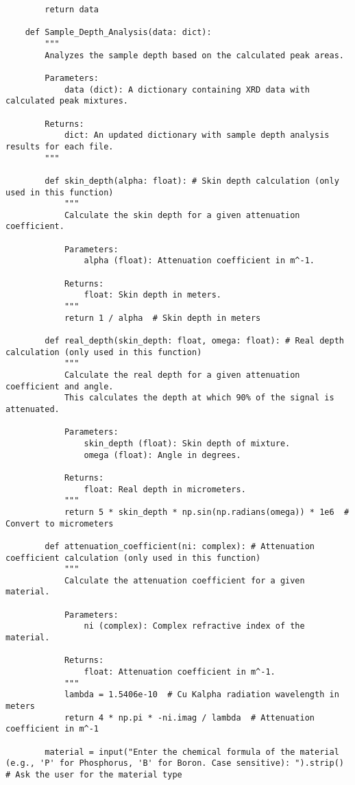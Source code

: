 \begin{lstlisting}
        return data

    def Sample_Depth_Analysis(data: dict):
        """
        Analyzes the sample depth based on the calculated peak areas.

        Parameters:
            data (dict): A dictionary containing XRD data with calculated peak mixtures.

        Returns:
            dict: An updated dictionary with sample depth analysis results for each file.
        """

        def skin_depth(alpha: float): # Skin depth calculation (only used in this function)
            """
            Calculate the skin depth for a given attenuation coefficient.

            Parameters:
                alpha (float): Attenuation coefficient in m^-1.

            Returns:
                float: Skin depth in meters.
            """
            return 1 / alpha  # Skin depth in meters

        def real_depth(skin_depth: float, omega: float): # Real depth calculation (only used in this function)
            """
            Calculate the real depth for a given attenuation coefficient and angle.
            This calculates the depth at which 90% of the signal is attenuated.

            Parameters:
                skin_depth (float): Skin depth of mixture.
                omega (float): Angle in degrees.

            Returns:
                float: Real depth in micrometers.
            """
            return 5 * skin_depth * np.sin(np.radians(omega)) * 1e6  # Convert to micrometers

        def attenuation_coefficient(ni: complex): # Attenuation coefficient calculation (only used in this function)
            """
            Calculate the attenuation coefficient for a given material.

            Parameters:
                ni (complex): Complex refractive index of the material.

            Returns:
                float: Attenuation coefficient in m^-1.
            """
            lambda = 1.5406e-10  # Cu Kalpha radiation wavelength in meters
            return 4 * np.pi * -ni.imag / lambda  # Attenuation coefficient in m^-1
        
        material = input("Enter the chemical formula of the material (e.g., 'P' for Phosphorus, 'B' for Boron. Case sensitive): ").strip()  # Ask the user for the material type


\end{lstlisting}
